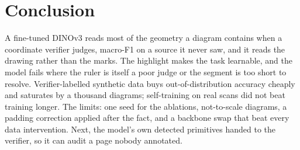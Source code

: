 \section{Conclusion}
\label{sec:conclusion}

A fine-tuned DINOv3 reads most of the geometry a diagram contains when a coordinate verifier judges, \fFtHo{} macro-F1 on a source it never saw, and it reads the drawing rather than the marks. The highlight makes the task learnable, and the model fails where the ruler is itself a poor judge or the segment is too short to resolve. Verifier-labelled synthetic data buys out-of-distribution accuracy cheaply and saturates by a thousand diagrams; self-training on real scans did not beat training longer. The limits: one seed for the ablations, \nNtsTestDiagrams{} not-to-scale diagrams, a padding correction applied after the fact, and a backbone swap that beat every data intervention. Next, the model's own detected primitives handed to the verifier, so it can audit a page nobody annotated.
